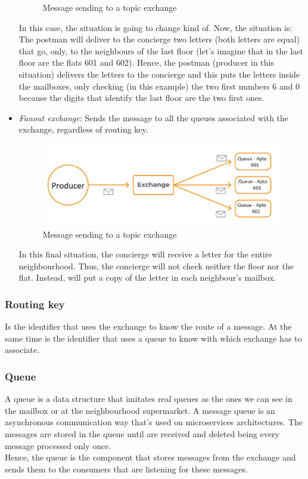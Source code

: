 \documentclass[12pt]{article}
\begin{document}
\begin{itemize}
\begin{figure}[H]
        \caption{Message sending to a topic exchange}
        \label{fig:topic_exchange}
    \end{figure}
    In this case, the situation is going to change kind of. Now, the situation is: The postman will deliver to the concierge two letters (both letters are equal) that go, only, to the neighbours of the last floor (let's imagine that in the last floor are the flats 601 and 602). Hence, the postman (producer in this situation) delivers the letters to the concierge and this puts the letters inside the mailboxes, only checking (in this example) the two first numbers 6 and 0 because the digits that identify the last floor are the two first ones.
    \item \textit{Fanout exchange}: Sends the message to all the queues associated with the exchange, regardless of routing key.
    \begin{figure}[H]
        \centering
        \includegraphics[scale = 0.4]{Images/fanout_exchange.jpg}
        \caption{Message sending to a topic exchange}
        \label{fig:fanout_exchange}
    \end{figure}
    \newpage
    In this final situation, the concierge will receive a letter for the entire neighbourhood. Thus, the concierge will not check neither the floor nor the flat. Instead, will put a copy of the letter in each neighbour's mailbox.
\end{itemize}

\subsubsection*{Routing key}
Is the identifier that uses the exchange to know the route of a message. At the same time is the identifier that uses a queue to know with which exchange has to associate.

\subsubsection*{Queue}
A queue is a data structure that imitates real queues as the ones we can see in the mailbox or at the neighbourhood supermarket.
A message queue is an asynchronous communication way that's used on microservices architectures. The messages are stored in the queue until are received and deleted being every message processed only once.\\
Hence, the queue is the component that stores messages from the exchange and sends them to the consumers that are listening for these messages.
\end{document}
